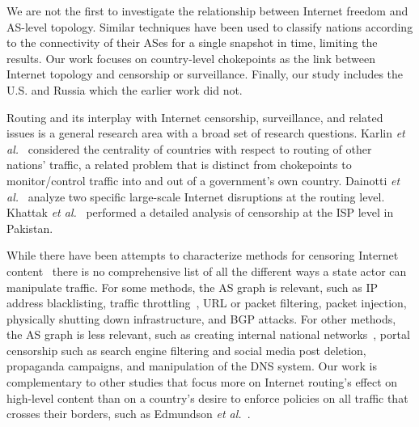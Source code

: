 \par We are not the first to investigate
the relationship between Internet freedom and AS-level
topology. Similar techniques have been used to classify nations
according to the connectivity of their ASes
\cite{politicsrouting} for a single snapshot in time,
limiting the results. Our work focuses on country-level
chokepoints as the link between Internet topology and censorship or
surveillance. Finally, our study includes
the U.S. and Russia which the earlier work did not.

Routing and its interplay with Internet censorship, surveillance, and related
issues is a general research area with a broad set of research questions.
Karlin \emph{et al.}~\cite{DBLP:journals/corr/abs-0903-3218} considered the
centrality of countries with respect to routing of other nations' traffic, a
related problem that is distinct from chokepoints to monitor/control traffic
into and out of a government's own country.  Dainotti \emph{et
al.}~\cite{Dainotti:2011:ACI:2068816.2068818} analyze two specific large-scale
Internet disruptions at the routing level.  Khattak \emph{et
al.}~\cite{Khattak:2014:LCI:2663716.2663750} performed a detailed analysis of
censorship at the ISP level in Pakistan.

While there have been attempts to characterize methods for
censoring Internet content~\cite{Tschantz2016a,Khattak2016a} there is no
comprehensive list of all the different ways a state actor can manipulate
traffic.  For some methods, the AS graph is relevant, such as IP address
blacklisting, traffic throttling~\cite{DBLP:journals/corr/Anderson13}, URL or
packet filtering, packet injection, physically shutting down infrastructure, and
BGP attacks.  For other methods, the AS graph is less relevant, such as creating
internal national networks~\cite{DBLP:journals/corr/abs-1209-6398}, portal
censorship such as search engine filtering and social media post deletion,
propaganda campaigns, and manipulation of the DNS system.  Our work is
complementary to other studies that focus more on Internet routing's effect on
high-level content than on a country's desire to enforce policies on all traffic
that crosses their borders, such as Edmundson \emph{et
al.}~\cite{Edmundson:2018:NHI:3209811.3211887}.

